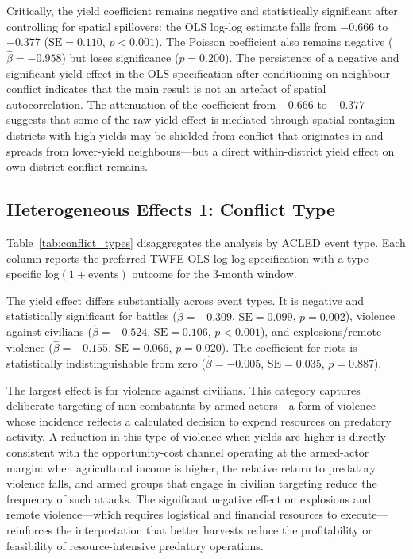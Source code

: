 Critically, the yield coefficient remains negative and statistically significant after controlling for spatial spillovers: the OLS log-log estimate falls from $-0.666$ to $-0.377$ ($\text{SE} = 0.110$, $p < 0.001$). The Poisson coefficient also remains negative ($\hat{\beta} = -0.958$) but loses significance ($p = 0.200$). The persistence of a negative and significant yield effect in the OLS specification after conditioning on neighbour conflict indicates that the main result is not an artefact of spatial autocorrelation. The attenuation of the coefficient from $-0.666$ to $-0.377$ suggests that some of the raw yield effect is mediated through spatial contagion---districts with high yields may be shielded from conflict that originates in and spreads from lower-yield neighbours---but a direct within-district yield effect on own-district conflict remains.

\subsection{Heterogeneous Effects 1: Conflict Type}

Table~\ref{tab:conflict_types} disaggregates the analysis by ACLED event type. Each column reports the preferred TWFE OLS log-log specification with a type-specific log$(1+\text{events})$ outcome for the 3-month window.

\begin{table}[H]
\centering
\caption{Heterogeneous Effects by Conflict Type (TWFE OLS Log-Log, 3-Month Window)}
\label{tab:conflict_types}
\begin{threeparttable}

\end{threeparttable}
\end{table}

The yield effect differs substantially across event types. It is negative and statistically significant for battles ($\hat{\beta} = -0.309$, $\text{SE} = 0.099$, $p = 0.002$), violence against civilians ($\hat{\beta} = -0.524$, $\text{SE} = 0.106$, $p < 0.001$), and explosions/remote violence ($\hat{\beta} = -0.155$, $\text{SE} = 0.066$, $p = 0.020$). The coefficient for riots is statistically indistinguishable from zero ($\hat{\beta} = -0.005$, $\text{SE} = 0.035$, $p = 0.887$).

The largest effect is for violence against civilians. This category captures deliberate targeting of non-combatants by armed actors---a form of violence whose incidence reflects a calculated decision to expend resources on predatory activity. A reduction in this type of violence when yields are higher is directly consistent with the opportunity-cost channel operating at the armed-actor margin: when agricultural income is higher, the relative return to predatory violence falls, and armed groups that engage in civilian targeting reduce the frequency of such attacks. The significant negative effect on explosions and remote violence---which requires logistical and financial resources to execute---reinforces the interpretation that better harvests reduce the profitability or feasibility of resource-intensive predatory operations.


